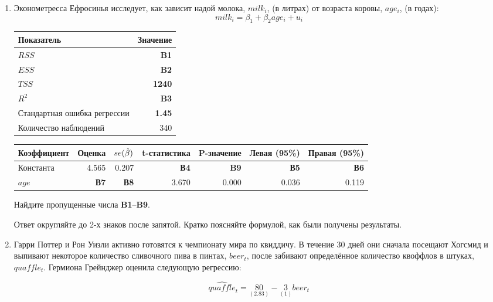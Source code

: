 \documentclass[12pt, a4paper]{article}\usepackage[]{graphicx}\usepackage[]{color}
\begin{document}





\begin{enumerate}


\item Эконометресса Ефросинья исследует, как зависит надой молока, $milk_i$, (в литрах) от возраста коровы, $age_i$, (в годах):
\[
milk_i = \beta_1 + \beta_2 age_i + u_i
\]

\begin{tabular}{lr} \toprule
Показатель & Значение \\
\midrule
$RSS$                        & \textbf{B1} \\
$ESS$                        & \textbf{B2} \\
$TSS$                        & \textbf{1240} \\
$R^2$                        & \textbf{B3} \\
Стандартная ошибка регрессии & \textbf{1.45} \\
Количество наблюдений        & 340 \\
\bottomrule
\end{tabular}

\begin{tabular}{lrrrrrr} \toprule
Коэффициент & Оценка & $se(\hat{\beta})$ & t-статистика & P-значение & Левая (95\%) & Правая (95\%) \\
\midrule
Константа & 4.565 & 0.207 & \textbf{В4} & \textbf{B9} & \textbf{В5} & \textbf{В6} \\
$age$ & \textbf{В7} & \textbf{В8} & 3.670 & 0.000 & 0.036 & 0.119 \\
\bottomrule
\end{tabular}

Найдите пропущенные числа \textbf{B1}--\textbf{B9}.

Ответ округляйте до 2-х знаков после запятой. Кратко поясняйте формулой, как были получены результаты.



\item Гарри Поттер и Рон Уизли активно готовятся к чемпионату мира по квиддичу. В течение 30 дней они сначала посещают Хогсмид и выпивают некоторое количество сливочного пива в пинтах, $beer_t$, после забивают определённое количество квоффлов в штуках, $quaffle_t$. Гермиона Грейнджер оценила следующую регрессию:

\[
\widehat{quaffle}_t = \underset{(2.83)}{80} - \underset{(1)}{3} beer_t
\]


\end{enumerate}
\end{document}

